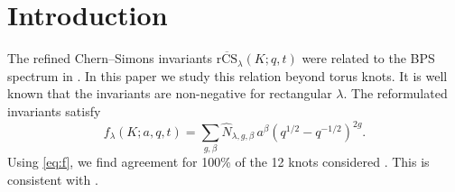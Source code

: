 \section{Introduction}
The refined Chern--Simons invariants $\overline{\mathrm{rCS}}_\lambda(K; q, t)$ were related to the
BPS spectrum in \cite{KN17}. In this paper we study this relation beyond torus knots. It is well
known that the invariants are non-negative for rectangular $\lambda$. The reformulated invariants
satisfy
\begin{equation}
  f_\lambda(K; a, q, t) = \sum_{g, \beta} \widehat N_{\lambda, g, \beta}\, a^\beta (q^{1/2} - q^{-1/2})^{2g} .
  \label{eq:f}
\end{equation}
Using \eqref{eq:f}, we find agreement for 100\% of the 12 knots considered
\cite{Macdonald95, TODO-missing}. This is consistent with \cite{KN17}.
